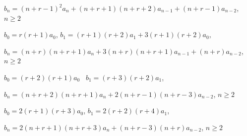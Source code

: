 \quad\;  \;
$b_{n}=(n+r-1)^{2}a_{n}+(n+r+1)(n+r+2)a_{n-1}+(n+r-1)a_{n-2}$,\;
$n\ge2$

$b_{0}=r(r+1)a_{0}$,\;
$b_{1}=(r+1)(r+2)a_{1}+3(r+1)(r+2)a_{0}$,

\quad\;  \;
$b_{n}=(n+r)(n+r+1)a_{n}+3(n+r)(n+r+1)a_{n-1}+(n+r)a_{n-2}$,\;
$n\ge2$

$b_{0}=(r+2)(r+1)a_{0}$  \,
$b_{1}=(r+3)(r+2)a_{1}$,

\quad\;  \;
$b_{n}=(n+r+2)(n+r+1)a_{n}+2(n+r-1)(n+r-3)a_{n-2}$,\;
$n\ge2$

$b_{0}=2(r+1)(r+3)a_{0}$,\;
$b_{1}=2(r+2)(r+4)a_{1}$,

\quad\;  \;
$b_{n}=2(n+r+1)(n+r+3)a_{n}+(n+r-3)(n+r)a_{n-2}$,\;
$n\ge2$

